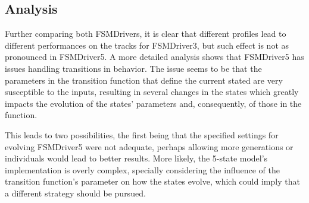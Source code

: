 



\subsection{Analysis}
Further comparing both FSMDrivers, it is clear that different profiles lead to different performances on the tracks for FSMDriver3, but such effect is not as pronounced in FSMDriver5. A more detailed analysis shows that FSMDriver5 has issues handling transitions in  behavior. The issue seems to be that the parameters  in the transition function that define the current stated are very susceptible to the inputs, resulting in several changes in the states which greatly impacts the evolution of the states' parameters and, consequently, of those in the function.

This leads to two possibilities, the first being that the specified settings for evolving FSMDriver5 were not adequate, perhaps allowing more generations or individuals would lead to better results. More likely, the 5-state model's implementation is overly complex, specially considering the influence of the transition function's parameter  on how the states evolve, which could imply that a different strategy should be pursued.